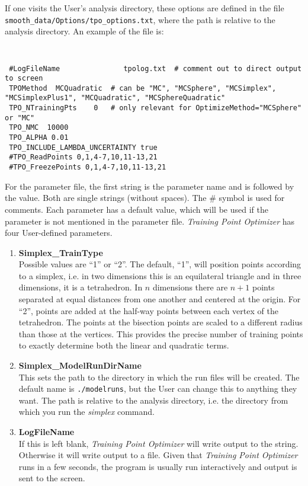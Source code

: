 \documentclass[UserManual.tex]{subfiles}
\begin{document}
If one visits the User's analysis directory, these options are defined in the file  {\tt smooth\_data/Options/tpo\_options.txt}, where the path is relative to the analysis directory. An example of the file is:
{\tt
\begin{verbatim}
 #LogFileName               tpolog.txt  # comment out to direct output to screen
 TPOMethod  MCQuadratic  # can be "MC", "MCSphere", "MCSimplex", "MCSimplexPlus1", "MCQuadratic", "MCSphereQuadratic"
 TPO_NTrainingPts    0   # only relevant for OptimizeMethod="MCSphere" or "MC"
 TPO_NMC  10000
 TPO_ALPHA 0.01
 TPO_INCLUDE_LAMBDA_UNCERTAINTY true
 #TPO_ReadPoints 0,1,4-7,10,11-13,21
 #TPO_FreezePoints 0,1,4-7,10,11-13,21
\end{verbatim}
}
For the parameter file, the first string is the parameter name and is followed by the value. Both are single strings (without spaces). The \# symbol is used for comments. Each parameter has a default value, which will be used if the parameter is not mentioned in the parameter file.  {\it Training Point Optimizer} has four User-defined parameters.
\begin{enumerate}\itemsep 0pt
    \item {\bf Simplex\_TrainType}\\
Possible values are ``1'' or ``2''. The default, ``1'', will position points according to a simplex, i.e. in two dimensions this is an equilateral triangle and in three dimensions, it is a tetrahedron. In $n$ dimensions there are $n+1$ points separated at equal distances from one another and centered at the origin. For ``2'', points are added at the half-way points between each vertex of the tetrahedron. The points at the bisection points are scaled to a different radius than those at the vertices. This provides the precise number of training points to exactly determine both the linear and quadratic terms.
\item {\bf Simplex\_ModelRunDirName}\\
This sets the path to the directory in which the run files will be created. The default name is {\tt ./modelruns}, but the User can change this to anything they want. The path is relative to the analysis directory, i.e. the directory from which you run the {\it simplex} command.
\item {\bf LogFileName}\\
If this is left blank, {\it Training Point Optimizer} will write output to the string. Otherwise it will write output to a file. Given that {\it Training Point Optimizer} runs in a few seconds, the program is usually run interactively and output is sent to the screen.
\end{enumerate}
\end{document}
